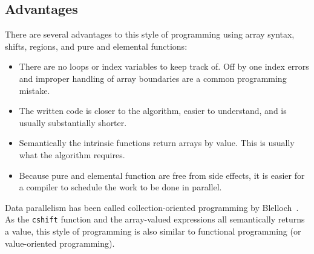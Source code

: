 \subsection{Advantages}

There are several advantages to this style of programming using array
syntax, shifts, regions, and pure and elemental functions:

\begin{itemize}
\item There are no loops or index variables to keep track of.  Off by
  one index errors and improper handling of array boundaries are a
  common programming mistake.
\item The written code is closer to the algorithm, easier to
  understand, and is usually substantially shorter.
\item Semantically the intrinsic functions return arrays by value.
  This is usually what the algorithm requires.
\item Because pure and elemental function are free from side effects,
  it is easier for a compiler to schedule the work to be done in
  parallel.
\end{itemize}


%


Data parallelism has been called
collection-oriented programming by
Blelloch~\cite{blelloch90,rajopadhye93}.  As the {\tt cshift}
function and the array-valued expressions all semantically returns a
value, this style of programming is also similar to functional
programming (or value-oriented programming). 


